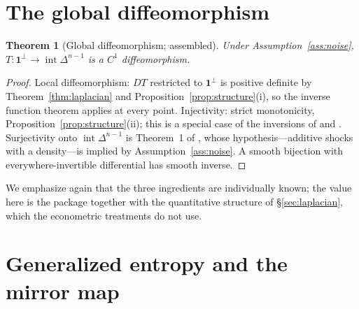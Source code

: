 \documentclass[11pt]{article}
\newtheorem{theorem}{Theorem}
\theoremstyle{definition}
\theoremstyle{remark}
\newcommand{\one}{\mathbf{1}}
\newcommand{\intsimplex}{\operatorname{int}\Delta^{n-1}}
\newcommand{\perpone}{\one^{\perp}}
\begin{document}
\section{The global diffeomorphism}
\label{sec:diffeo}

\begin{theorem}[Global diffeomorphism; assembled]
\label{thm:diffeo}
Under Assumption~\ref{ass:noise},
$T : \perpone \to \intsimplex$ is a $C^1$ diffeomorphism.
\end{theorem}

\begin{proof}
Local diffeomorphism: $DT$ restricted to $\perpone$ is positive definite by
Theorem~\ref{thm:laplacian} and Proposition~\ref{prop:structure}(i), so the
inverse function theorem applies at every point.  Injectivity: strict
monotonicity, Proposition~\ref{prop:structure}(ii); this is a special case of
the inversions of \textcite{hotzmiller1993} and
\textcite{berrygandhihaile2013}.  Surjectivity onto $\intsimplex$ is
Theorem~1 of \textcite{noretstakahashi2013}, whose hypothesis---additive
shocks with a density---is implied by Assumption~\ref{ass:noise}.  A smooth
bijection with everywhere-invertible differential has smooth inverse.
\end{proof}

We emphasize again that the three ingredients are individually known; the
value here is the package together with the quantitative structure of
\S\ref{sec:laplacian}, which the econometric treatments do not use.

\section{Generalized entropy and the mirror map}
\label{sec:entropy}
\end{document}
